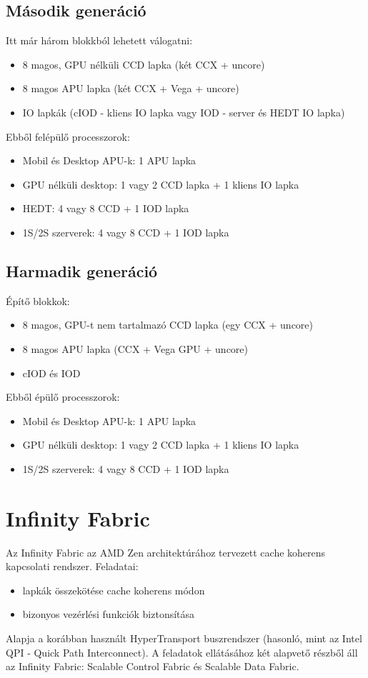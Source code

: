 \subsection{Második generáció}
Itt már három blokkból lehetett válogatni:
\begin{itemize}
    \item 8 magos, GPU nélküli CCD lapka (két CCX + uncore)
    \item 8 magos APU lapka (két CCX + Vega + uncore)
    \item IO lapkák (cIOD - kliens IO lapka vagy IOD - server és HEDT IO lapka)
\end{itemize}

Ebből felépülő processzorok:
\begin{itemize}
    \item Mobil és Desktop APU-k: 1 APU lapka
    \item GPU nélküli desktop: 1 vagy 2 CCD lapka + 1 kliens IO lapka
    \item HEDT: 4 vagy 8 CCD + 1 IOD lapka
    \item 1S/2S szerverek: 4 vagy 8 CCD + 1 IOD lapka
\end{itemize}

\subsection{Harmadik generáció}
Építő blokkok:
\begin{itemize}
    \item 8 magos, GPU-t nem tartalmazó CCD lapka (egy CCX + uncore)
    \item 8 magos APU lapka (CCX + Vega GPU + uncore)
    \item cIOD és IOD
\end{itemize}

Ebből épülő processzorok:
\begin{itemize}
    \item Mobil és Desktop APU-k: 1 APU lapka
    \item GPU nélküli desktop: 1 vagy 2 CCD lapka + 1 kliens IO lapka
    \item 1S/2S szerverek: 4 vagy 8 CCD + 1 IOD lapka
\end{itemize}

\section{Infinity Fabric}
Az Infinity Fabric az AMD Zen architektúrához tervezett cache koherens kapcsolati rendszer.
Feladatai:
\begin{itemize}
    \item lapkák összekötése cache koherens módon
    \item bizonyos vezérlési funkciók biztonsítása
\end{itemize}
Alapja a korábban használt HyperTransport buszrendszer (hasonló, mint az Intel QPI - Quick Path Interconnect).
A feladatok ellátásához két alapvető részből áll az Infinity Fabric: Scalable Control Fabric és Scalable Data Fabric.

